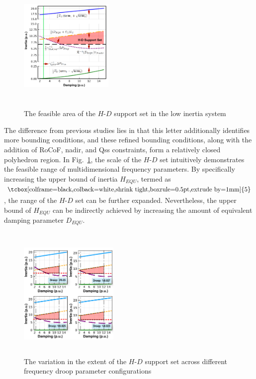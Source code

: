 \documentclass[lettersize,journal]{IEEEtran}
\newcommand{\ciao}[1]{{\setlength\fboxrule{0pt}\fbox{\tcbox[colframe=black,colback=white,shrink tight,boxrule=0.5pt,extrude by=1mm]{\small #1}}}}
\begin{document}
\begin{figure}[!t]\vspace{-0.125cm}
  \centering
  \includegraphics[width=0.4\textwidth,height=6.50cm]{inertia_damping_supportset.pdf}\vspace{-0.125cm}
  \caption{The feasible area of the $H$-$D$ support set in the low inertia system}\vspace{-0.25cm}
  \label{fig:inertia_damping_supportset}
\end{figure}

The difference from previous studies lies in that this letter additionally identifies more bounding conditions, and these refined bounding conditions, along with the addition of RoCoF, nadir, and Qss constraints, form a relatively closed polyhedron region.  In Fig.~\ref{fig:inertia_damping_supportset}, the scale of the $H$-$D$ set intuitively demonstrates the feasible range of multidimensional frequency  parameters. By specifically increasing the upper bound of inertia $H_{EQU}$, termed as $\ciao{5}$, the range of the $H$-$D$ set can be further expanded. Nevertheless, the upper bound of $H_{EQU}$ can be indirectly achieved by increasing the amount of equivalent damping parameter $D_{EQU}$.

\vspace{-0.25cm}

\begin{figure}[!h]
  \centering
  \includegraphics[width=0.425\textwidth,height=6.5cm]{inertia_damping_feasible_region.pdf}\vspace{-0.125cm}
  \caption{The variation in the extent of the $H$-$D$ support set across different frequency droop parameter configurations}\vspace{-0.25cm}
  \label{fig:inertia_damping_feasible_region}
\end{figure}
\end{document}
